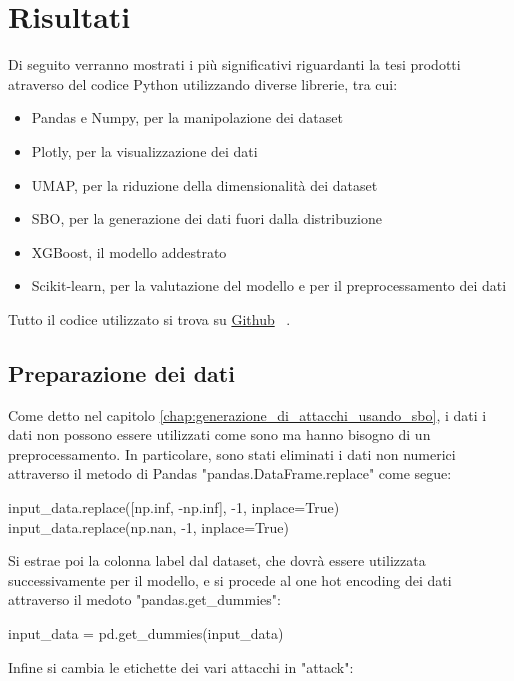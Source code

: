 \chapter{Risultati}
\label{chap:risultati}

Di seguito verranno mostrati i più significativi riguardanti la tesi prodotti atraverso del codice Python utilizzando diverse librerie, tra cui:

\begin{itemize}
    \item Pandas e Numpy, per la manipolazione dei dataset
    \item Plotly, per la visualizzazione dei dati
    \item UMAP, per la riduzione della dimensionalità dei dataset 
    \item SBO, per la generazione dei dati fuori dalla distribuzione
    \item XGBoost, il modello addestrato
    \item Scikit-learn, per la valutazione del modello e per il preprocessamento dei dati
\end{itemize}

Tutto il codice utilizzato si trova su \href{https://github.com/guglielmobartelloni/thesis-utils}{Github}~\cite{github} .

\section{Preparazione dei dati}

Come detto nel capitolo \ref{chap:generazione_di_attacchi_usando_sbo}, i dati i dati non possono essere utilizzati come sono ma hanno bisogno di un preprocessamento. In particolare, sono stati eliminati i dati non numerici attraverso il metodo di Pandas "pandas.DataFrame.replace" come segue:


\begin{python}
input_data.replace([np.inf, -np.inf], -1, inplace=True)
input_data.replace(np.nan, -1, inplace=True)
\end{python}

Si estrae poi la colonna label dal dataset, che dovrà essere utilizzata successivamente per il modello, e si procede al one hot encoding dei dati attraverso il medoto "pandas.get\_dummies":

\begin{python}
input_data = pd.get_dummies(input_data)
\end{python}

Infine si cambia le etichette dei vari attacchi in "attack":

